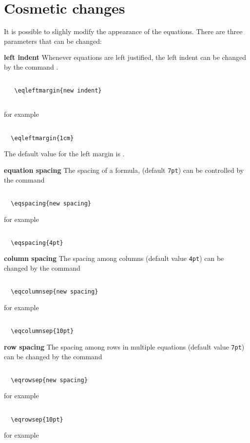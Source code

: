 \documentclass[a4paper,final,11pt]{article}
\begin{document}
\section{Cosmetic changes}
It is possible to slighly modify the appearance of the equations.
There are three parameters that can be changed:
\begin{dotlist}
  \item[\textbf{left indent}] Whenever equations are left justified, the left indent
  can be changed by the command .
\begin{verbatim}
   
   \eqleftmargin{new indent}
	
\end{verbatim}
for example
\begin{verbatim}
  
  \eqleftmargin{1cm}

\end{verbatim}
The default value for the left margin is . 

\item[\textbf{equation spacing}] The spacing of a formula,
(default \verb'7pt') can be controlled by the command
\begin{verbatim}

  \eqspacing{new spacing}

\end{verbatim}    
for example
\begin{verbatim}
  
  \eqspacing{4pt}

\end{verbatim}
\item[\textbf{column spacing}]
The spacing among columns (default value \verb'4pt') can be changed by the command
\begin{verbatim}

  \eqcolumnsep{new spacing}

\end{verbatim}  
for example
\begin{verbatim}
    
  \eqcolumnsep{10pt}

\end{verbatim}
\item[\textbf{row spacing}] The spacing among rows in multiple
equations (default value \verb'7pt') can be changed by the command
\begin{verbatim}

  \eqrowsep{new spacing}

\end{verbatim}
for example
\begin{verbatim}

  \eqrowsep{10pt}

\end{verbatim}
\end{dotlist}
for example
\end{document}
